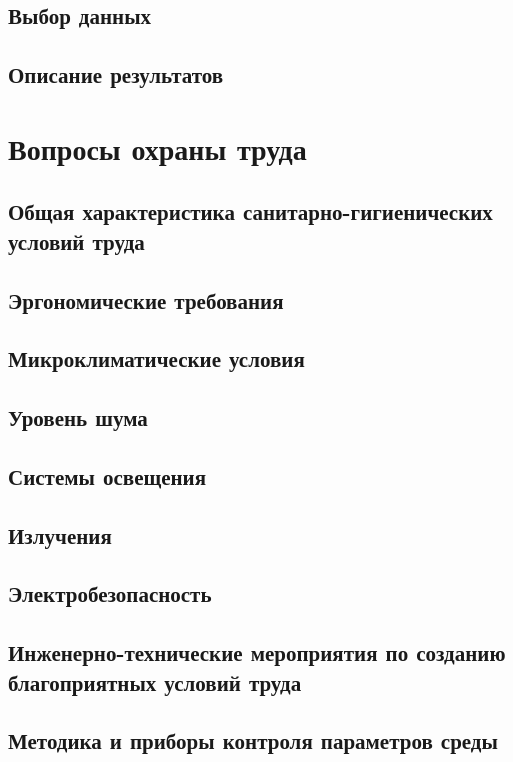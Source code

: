 \documentclass[12pt,a4paper]{report}
\begin{document}
\section{Выбор данных}
\section{Описание результатов}

\chapter{Вопросы охраны труда}

\section{Общая характеристика санитарно-гигиенических условий труда}
\section{Эргономические требования}
\section{Микроклиматические условия}
\section{Уровень шума}
\section{Системы освещения}
\section{Излучения}
\section{Электробезопасность}
\section{Инженерно-технические мероприятия по созданию благоприятных условий труда}
\section{Методика и приборы контроля параметров среды}

\end{document}
